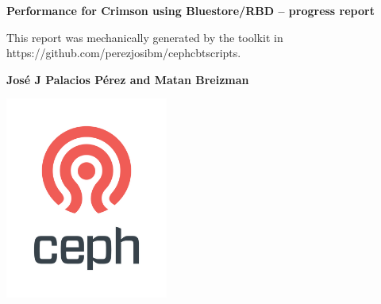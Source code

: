 \begin{titlepage}
   \begin{center}
       \vspace*{1cm}

       \Huge
       \textbf{Performance for Crimson using Bluestore/RBD -- progress report}

       \vspace{0.5cm}
       \LARGE
        This report was mechanically generated by the toolkit in https://github.com/perezjosibm/cephcbtscripts.

       \vspace{1.5cm}

       \textbf{Jos\'e J Palacios P\'erez and Matan Breizman}
       \vfill

       \vspace{0.8cm}
       \includegraphics[width=0.4\textwidth]{ceph_362px.png}
   \end{center}
\end{titlepage}
\tableofcontents
